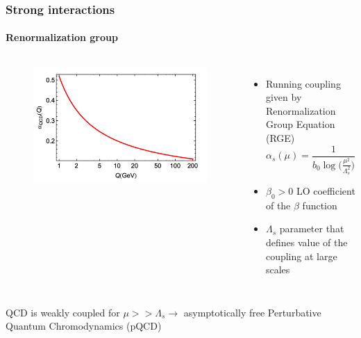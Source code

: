 \documentclass[aspectratio=43]{beamer}
\begin{document}
\begin{frame}

	\frametitle{Strong interactions}
	\framesubtitle{Renormalization group}

	\begin{columns}	
	
		
		\begin{figure}
			\includegraphics[width = 5 cm]{plots/qcd_coupling.png}
		\end{figure}

	
		\begin{itemize}
			\item \footnotesize Running coupling given by Renormalization Group Equation (RGE)
			\begin{equation}
				\alpha_{s}(\mu) = \frac{1}{b_{0} \log\big( \frac{\mu^{2}}{\Lambda_{s}^{2}}\big)} \nonumber
			\end{equation}
			\item \footnotesize $\beta_{0} > 0$ LO coefficient of the $\beta$ function
			\item \footnotesize $\Lambda_{s}$ parameter that defines value of the coupling at large scales
		\end{itemize}

	\end{columns}
	
	\vspace{1cm}
	\center QCD is weakly coupled for $\mu >> \Lambda_{s} \longrightarrow$ asymptotically free
	\center \color{red} Perturbative Quantum Chromodynamics (pQCD)

\end{frame}
\end{document}
